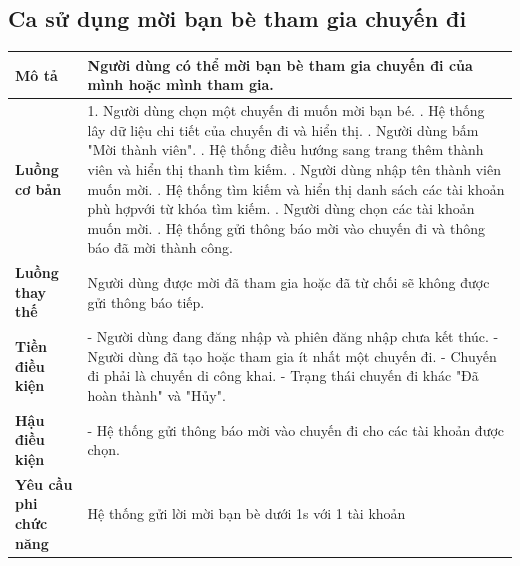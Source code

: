 \subsection{Ca sử dụng mời bạn bè tham gia chuyến đi}
\vspace{0.5cm}


\noindent 
\begin{tabularx}{\linewidth}{| l | X |} 
\hline 
\textbf{Mô tả} & Người dùng có thể mời bạn bè tham gia chuyến đi của mình hoặc mình tham gia. \\
\hline 
\textbf{Luồng cơ bản} & 1. Người dùng chọn một chuyến đi muốn mời bạn bé. \newline
                        2. Hệ thống lây dữ liệu chi tiết của chuyến đi và hiển thị. \newline
                        3. Người dùng bấm "Mời thành viên". \newline
                        4. Hệ thống điều hướng sang trang thêm thành viên và hiển thị thanh tìm kiếm. \newline
                        5. Người dùng nhập tên thành viên muốn mời. \newline
                        6. Hệ thống tìm kiếm và hiển thị danh sách các tài khoản phù hợpvới từ khóa tìm kiếm. \newline
                        7. Người dùng chọn các tài khoản muốn mời. \newline
                        8. Hệ thống gửi thông báo mời vào chuyến đi và thông báo đã mời thành công. \\
               
\hline 
\textbf{Luồng thay thế} & Người dùng được mời đã tham gia hoặc đã từ chối sẽ không được gửi thông báo tiếp. \\
       
\hline 
\textbf{Tiền điều kiện} & - Người dùng đang đăng nhập và phiên đăng nhập chưa kết thúc.\newline
                        - Người dùng đã tạo hoặc tham gia ít nhất một chuyến đi. \newline
                        - Chuyến đi phải là chuyến di công khai.\newline
                        - Trạng thái chuyến đi khác "Đã hoàn thành" và "Hủy". \\

\hline 
\textbf{Hậu điều kiện} & - Hệ thống gửi thông báo mời vào chuyến đi cho các tài khoản được chọn. \\
\hline 
\textbf{Yêu cầu phi chức năng} & Hệ thống gửi lời mời bạn bè dưới 1s với 1 tài khoản \\
\hline 
\end{tabularx}

